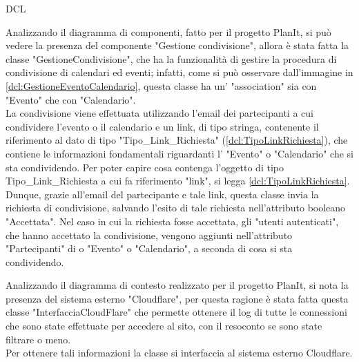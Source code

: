 \begin{listaPersonale}{DCL}
\begin{listaPersonale2}[DCL]{}
        Analizzando il diagramma di componenti, fatto per il progetto PlanIt, si può vedere la presenza del componente "Gestione condivisione", allora è stata fatta la classe "GestioneCondivisione", che ha la funzionalità di gestire la procedura di condivisione di calendari ed eventi; infatti, come si può osservare dall'immagine in \ref{dcl:GestioneEventoCalendario}, questa classe ha un' "association" sia con "Evento" che con "Calendario".  \\
        La condivisione viene effettuata utilizzando l'email dei partecipanti a cui condividere l'evento o il calendario e un link, di tipo stringa, contenente il riferimento al dato di tipo "Tipo\_Link\_Richiesta" (\ref{dcl:TipoLinkRichiesta}), che contiene le informazioni fondamentali riguardanti l' "Evento" o "Calendario" che si sta condividendo. Per poter capire cosa contenga l'oggetto di tipo Tipo\_Link\_Richiesta a cui fa riferimento "link", si legga \ref{dcl:TipoLinkRichiesta}. Dunque, grazie all'email del partecipante e tale link, questa classe invia la richiesta di condivisione, salvando l'esito di tale richiesta nell'attributo booleano "Accettata". Nel caso in cui la richiesta fosse accettata, gli "utenti autenticati", che hanno accettato la condivisione, vengono aggiunti nell'attributo "Partecipanti" di o "Evento" o "Calendario", a seconda di cosa si sta condividendo.


        \begin{center}
            
        \end{center}


    \end{listaPersonale2}
    \newpage

    Analizzando il diagramma di contesto realizzato per il progetto PlanIt, si nota la presenza del sistema esterno "Cloudflare", per questa ragione è stata fatta questa classe "InterfacciaCloudFlare" che permette ottenere il log di tutte le connessioni che sono state effettuate per accedere al sito, con il resoconto se sono state filtrare o meno. \\
    Per ottenere tali informazioni la classe si interfaccia al sistema esterno Cloudflare.


\end{listaPersonale}
